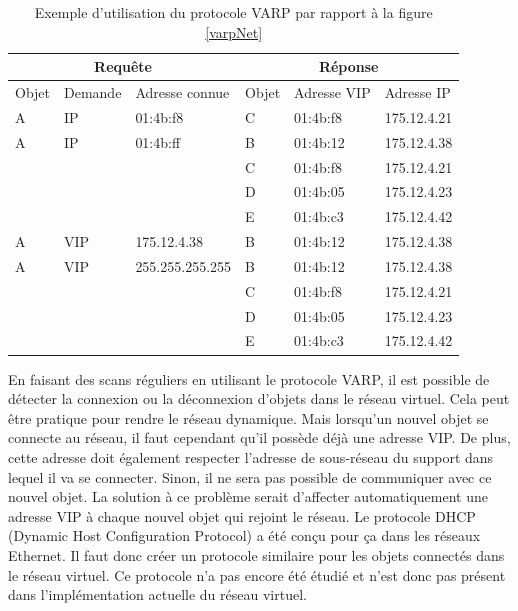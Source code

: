 		\begin{table}[!ht]
			\centering
			\begin{tabular}{|l|l|l||l|l|l|}
				\hline
				\multicolumn{3}{|c||}{Requête}     & \multicolumn{3}{|c|}{Réponse}  \\ \hline
				Objet & Demande & Adresse connue  & Objet & Adresse VIP & Adresse IP  \\ 
\hline\hline
				A     & IP      & 01:4b:f8        & C     & 01:4b:f8    & 175.12.4.21 \\ \hline
				A     & IP      & 01:4b:ff        & B     & 01:4b:12    & 175.12.4.38 \\
				      &         &                 & C     & 01:4b:f8    & 175.12.4.21 \\
				      &         &                 & D     & 01:4b:05    & 175.12.4.23 \\
				      &         &                 & E     & 01:4b:c3    & 175.12.4.42 \\ \hline
				A     & VIP     & 175.12.4.38     & B     & 01:4b:12    & 175.12.4.38 \\ \hline
				A     & VIP     & 255.255.255.255 & B     & 01:4b:12    & 175.12.4.38 \\
				      &         &                 & C     & 01:4b:f8    & 175.12.4.21 \\
				      &         &                 & D     & 01:4b:05    & 175.12.4.23 \\
				      &         &                 & E     & 01:4b:c3    & 175.12.4.42 \\ \hline
			\end{tabular}
			\caption{Exemple d'utilisation du protocole VARP par rapport à la figure \ref{varpNet}}
			\label{varpEx}
		\end{table}
		
		En faisant des scans réguliers en utilisant le protocole VARP, il est possible de détecter
		la connexion ou la déconnexion d'objets dans le réseau virtuel. Cela peut être pratique 
		pour rendre le réseau dynamique. Mais lorsqu'un nouvel objet se connecte au réseau, il faut
		cependant qu'il possède déjà une adresse VIP. De plus, cette adresse doit également respecter
		l'adresse de sous-réseau du support dans lequel il va se connecter. Sinon, il ne sera pas 
		possible de communiquer avec ce nouvel objet. La solution à ce problème serait d'affecter
		automatiquement une adresse VIP à chaque nouvel objet qui rejoint le réseau. Le protocole
		DHCP (Dynamic Host Configuration Protocol) a été conçu pour ça dans les réseaux Ethernet. Il
		faut donc créer un protocole similaire pour les objets connectés dans le réseau virtuel.
		Ce protocole n'a pas encore été étudié et n'est donc pas présent dans l'implémentation 
		actuelle du réseau virtuel.
		
